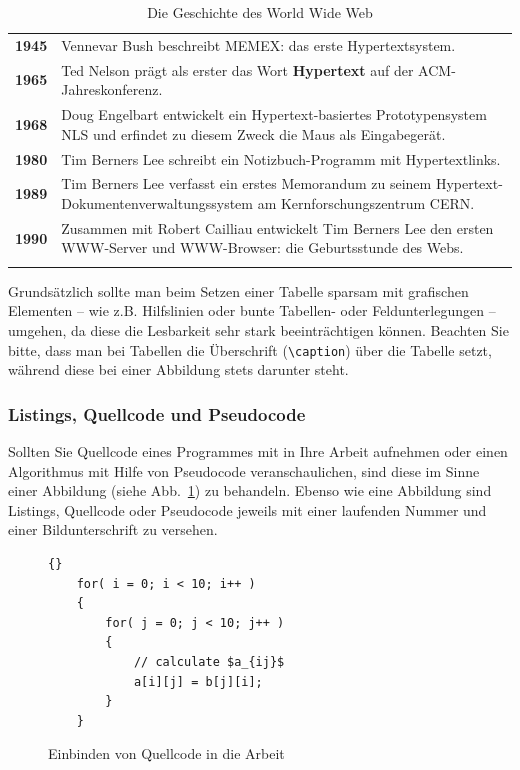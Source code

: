 \begin{table}
\caption{Die Geschichte des World Wide Web}
\begin{tabular}{rp{12cm}} \noalign{\smallskip} \hline \noalign{\smallskip}
{\bf 1945} & Vennevar Bush beschreibt MEMEX: das erste Hypertextsystem.\\
{\bf 1965} & Ted Nelson prägt als erster das Wort {\bf Hypertext} auf der ACM-Jahreskonferenz.\\ 
{\bf 1968} & Doug Engelbart entwickelt ein Hypertext-basiertes Prototypensystem NLS und erfindet zu diesem Zweck die Maus als Eingabegerät.\\
{\bf 1980} & Tim Berners Lee schreibt ein Notizbuch-Programm mit Hypertextlinks.\\
{\bf 1989} & Tim Berners Lee verfasst ein erstes Memorandum zu seinem Hypertext-Dokumentenverwaltungssystem am Kernforschungszentrum CERN.\\
{\bf 1990} & Zusammen mit Robert Cailliau entwickelt Tim Berners Lee den ersten WWW-Server und WWW-Browser: die Geburtsstunde des Webs.\\  \noalign{\smallskip} \hline
\end{tabular}
\label{tab_HistoryWWW}
\end{table}  


\smallskip

\noindent
Grundsätzlich sollte man beim Setzen einer Tabelle sparsam mit grafischen Elementen -- wie z.B. Hilfslinien oder bunte Tabellen- oder Feldunterlegungen -- umgehen, da diese die Lesbarkeit sehr stark beeinträchtigen können.
Beachten Sie bitte, dass man bei Tabellen die Überschrift ({\tt \textbackslash{}caption}) über die Tabelle setzt, während diese bei einer Abbildung stets darunter steht.

\subsubsection{Listings, Quellcode und Pseudocode}

Sollten Sie Quellcode eines Programmes mit in Ihre Arbeit aufnehmen oder einen Algorithmus mit Hilfe von Pseudocode veranschaulichen, sind diese im Sinne einer Abbildung (siehe Abb.~\ref{fig_Abb3}) zu behandeln.
Ebenso wie eine Abbildung sind Listings, Quellcode oder Pseudocode jeweils mit einer laufenden Nummer und einer Bildunterschrift zu versehen.

\begin{figure}[ht]
\lstset{language=c++}
\begin{lstlisting}{}
    for( i = 0; i < 10; i++ )
    {
        for( j = 0; j < 10; j++ )
        {
            // calculate $a_{ij}$
            a[i][j] = b[j][i];
        }
    }

\end{lstlisting}
  \caption{Einbinden von Quellcode in die Arbeit}
  \label{fig_Abb3}
\end{figure}

